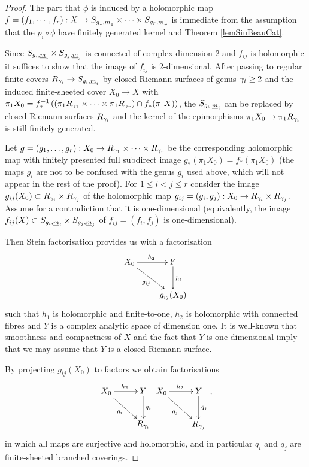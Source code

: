 \begin{proof}
 The part that $\phi$ is induced by a holomorphic map $f= (f_1,\cdots,f_r): X \rightarrow S_{g_1,{\underline{m}}_1} \times \cdots \times S_{g_r,{\underline{m}}_r}$ is immediate from the assumption that the $p_i\circ \phi$ have finitely generated kernel and Theorem \ref{lemSiuBeauCat}.
 
 Since $S_{g_i,{\underline{m}}_i} \times S_{g_j,{\underline{m}}_j}$ is connected of complex dimension $2$ and $f_{ij}$ is holomorphic it suffices to show that the image of $f_{ij}$ is 2-dimensional. After passing to regular finite covers $R_{\gamma_i}\rightarrow S_{g_i,{\underline{m}}_i}$ by closed Riemann surfaces of genus $\gamma_i\geq 2$ and the induced finite-sheeted cover $X_0\rightarrow X$ with $\pi_1 X_0 = f_{\ast}^{-1}\left((\pi_1 R_{\gamma_1}\times \dots \times \pi_1 R_{\gamma_r} ) \cap f_{\ast}(\pi_1 X)\right)$, the $S_{g_i,{\underline{m}}_i}$ can be replaced by closed Riemann surfaces $R_{\gamma_i}$ and the kernel of the epimorphisms $\pi_1 X_0\to \pi_1 R_{\gamma_i}$ is still finitely generated.
 
 Let $g=(g_1,\dots,g_r): X_0 \rightarrow R_{\gamma_1} \times \dots \times R_{\gamma_r}$ be the corresponding holomorphic map with finitely presented full subdirect image $g_{\ast}(\pi_1 X_0) = f_{\ast}(\pi_1 X_0)$ (the maps $g_i$ are not to be confused with the genus $g_i$ used above, which will not appear in the rest of the proof). For $1\leq i < j \leq r$ consider the image $g_{ij}(X_0)\subset R_{\gamma_i}\times R_{\gamma_j}$ of the holomorphic map $g_{ij}=(g_i,g_j): X_0 \rightarrow R_{\gamma_i}\times R_{\gamma_j}$. Assume for a contradiction that it is one-dimensional (equivalently, the image $f_{ij}(X) \subset S_{g_i,{\underline{m}}_i} \times S_{g_j,{\underline{m}}_j}$ of $f_{ij}=(f_i,f_j)$ is one-dimensional).
 
 Then Stein factorisation provides us with a factorisation
 \[
 \xymatrix{ X_0 \ar[r]^{h_2}\ar[dr]_{g_{ij}} & Y \ar[d]^{h_1}\\ & g_{ij}(X_0)}
 \]
 such that $h_1$ is holomorphic and finite-to-one, $h_2$ is holomorphic with connected fibres and $Y$ is a complex analytic space of dimension one. It is well-known that smoothness and compactness of $X$ and the fact that $Y$ is one-dimensional imply that we may assume that $Y$ is a closed Riemann surface.
 
 By projecting $g_{ij}(X_0)$ to factors we obtain factorisations
 \[
  \xymatrix{ X_0 \ar[r]^{h_2}\ar[rd]_{g_i} & Y\ar[d]^{q_i} \\ & R_{\g_i}}  \vspace{2cm}   \xymatrix{ X_0 \ar[r]^{h_2}\ar[rd]_{g_j}  & Y\ar[d]^{q_j} \\ & R_{\g_j}},
 \]
 in which all maps are surjective and holomorphic, and in particular $q_i$ and $q_j$ are finite-sheeted branched coverings. 
 

\end{proof}

